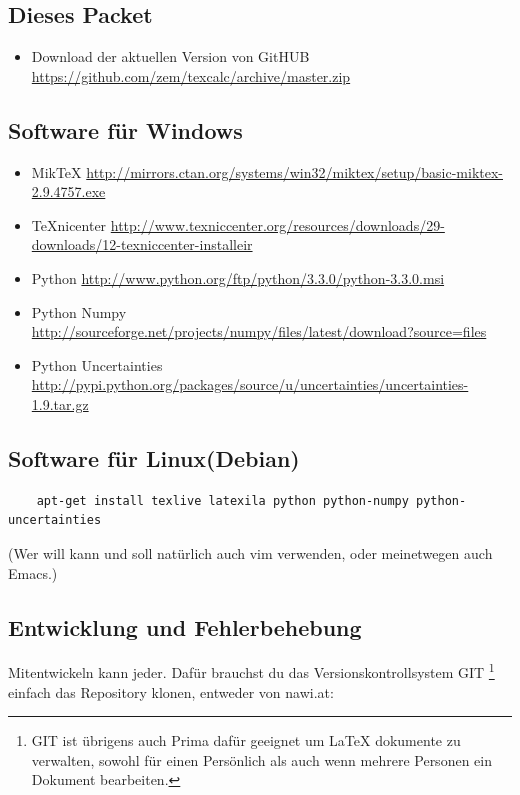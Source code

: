 \documentclass[a4paper]{article}
\begin{document}
\subsection{Dieses Packet}

\begin{itemize}
	\item Download der aktuellen Version von GitHUB \url{https://github.com/zem/texcalc/archive/master.zip}
\end{itemize}

\subsection{Software für Windows}

\begin{itemize}
	\item MikTeX \url{http://mirrors.ctan.org/systems/win32/miktex/setup/basic-miktex-2.9.4757.exe}
	\item TeXnicenter \url{http://www.texniccenter.org/resources/downloads/29-downloads/12-texniccenter-installeir}
	\item Python \url{http://www.python.org/ftp/python/3.3.0/python-3.3.0.msi}
	\item Python Numpy \url{http://sourceforge.net/projects/numpy/files/latest/download?source=files}
	\item Python Uncertainties \url{http://pypi.python.org/packages/source/u/uncertainties/uncertainties-1.9.tar.gz}
\end{itemize}

\subsection{Software für Linux(Debian)}

\begin{verbatim}
	apt-get install texlive latexila python python-numpy python-uncertainties
\end{verbatim}

(Wer will kann und soll natürlich auch vim verwenden, oder meinetwegen auch Emacs.)

\subsection{Entwicklung und Fehlerbehebung}

Mitentwickeln kann jeder. Dafür brauchst du das Versionskontrollsystem GIT
\footnote{GIT ist übrigens auch Prima dafür geeignet um LaTeX dokumente zu verwalten, 
sowohl für einen Persönlich als auch wenn mehrere Personen ein Dokument bearbeiten. } 
einfach das Repository klonen, entweder von nawi.at: 
\end{document}
